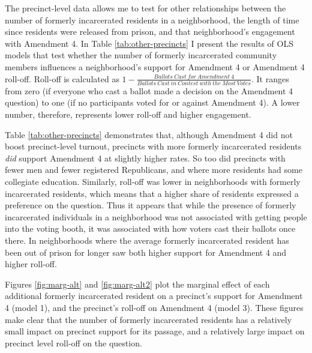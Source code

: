 \documentclass[
  12pt,
]{article}
\begin{document}
The precinct-level data allows me to test for other relationships between the number of formerly incarcerated residents in a neighborhood, the length of time since residents were released from prison, and that neighborhood's engagement with Amendment 4. In Table \ref{tab:other-precincts} I present the results of OLS models that test whether the number of formerly incarcerated community members influences a neighborhood's support for Amendment 4 or Amendment 4 roll-off. Roll-off is calculated as \(1 - \frac{Ballots\:Cast\:for\:Amendment\:4}{Ballots\:Cast\:in\:Contest\:with\:the\:Most\:Votes}\). It ranges from zero (if everyone who cast a ballot made a decision on the Amendment 4 question) to one (if no participants voted for or against Amendment 4). A lower number, therefore, represents lower roll-off and higher engagement.

\begin{singlespace}


\end{singlespace}

Table \ref{tab:other-precincts} demonstrates that, although Amendment 4 did not boost precinct-level turnout, precincts with more formerly incarcerated residents \emph{did} support Amendment 4 at slightly higher rates. So too did precincts with fewer men and fewer registered Republicans, and where more residents had some collegiate education. Similarly, roll-off was lower in neighborhoods with formerly incarcerated residents, which means that a higher share of residents expressed a preference on the question. Thus it appears that while the presence of formerly incarcerated individuals in a neighborhood was not associated with getting people into the voting booth, it was associated with how voters cast their ballots once there. In neighborhoods where the average formerly incarcerated resident has been out of prison for longer saw both higher support for Amendment 4 and higher roll-off.

Figures \ref{fig:marg-alt} and \ref{fig:marg-alt2} plot the marginal effect of each additional formerly incarcerated resident on a precinct's support for Amendment 4 (model 1), and the precinct's roll-off on Amendment 4 (model 3). These figures make clear that the number of formerly incarcerated residents has a relatively small impact on precinct support for its passage, and a relatively large impact on precinct level roll-off on the question.
\end{document}
